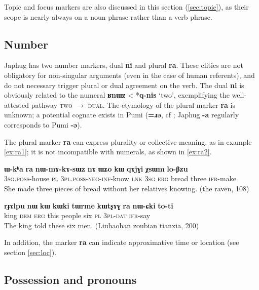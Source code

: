 \documentclass[oldfontcommands,oneside,a4paper,11pt]{article}
\newcommand{\ipa}[1]{\mbox{\phon\textbf{#1}}} %
\begin{document}
Topic and focus markers are also discussed in this section (\ref{sec:topic}), as their scope is nearly always on a noun phrase rather than a verb phrase.

\subsection{Number} \label{sec:number}

Japhug has two number markers, dual \ipa{ni} and plural \ipa{ra}. These clitics are not obligatory for non-singular arguments (even in the case of human referents), and do not necessary trigger plural or dual agreement on the verb. The dual \ipa{ni} is obviously related to the numeral \ipa{ʁnɯz} < *\ipa{q-nis} `two', exemplifying the well-attested pathway \textsc{two} $\rightarrow$ \textsc{dual}. The etymology of the plural marker \ipa{ra} is unknown; a potential cognate exists in Pumi (\ipa{=ɹə}, cf \citealt[135]{daudey14grammar}; Japhug \ipa{-a} regularly corresponds to Pumi \ipa{-ə}).
 
  The plural marker \ipa{ra} can express plurality or collective meaning, as in example \ref{ex:ra1}; it is not incompatible with numerals, as shown in \ref{ex:ra2}.
 
\begin{exe}
\ex \label{ex:ra1}
\gll \ipa{ɯ-kʰa} 	\ipa{ra} 	\ipa{nɯ-mɤ-kɤ-sɯz} 	\ipa{nɤ} 	\ipa{ɯʑo} 	\ipa{kɯ} 	\ipa{qɤjɣi} 	\ipa{χsɯm} 	\ipa{lo-βzu} \\
\textsc{3sg.poss}-house \textsc{pl} \textsc{3pl.poss-neg-inf}-know \textsc{lnk} \textsc{3sg} \textsc{erg} bread three \textsc{ifr}-make \\
\glt She made three pieces of bread without her relatives knowing. (the raven, 108)
\end{exe}

\begin{exe}
\ex \label{ex:ra2}
\gll 
 \ipa{rɟɤlpu} 	\ipa{nɯ} 	\ipa{kɯ} 	\ipa{kɯki} 	\ipa{tɯrme} 	\ipa{kɯtʂɤɣ} 	\ipa{ra} 	\ipa{nɯ-ɕki}  	\ipa{to-ti} \\
 king \textsc{dem} \textsc{erg} this people six \textsc{pl} \textsc{3pl-dat} \textsc{ifr}-say  \\
 \glt The king told these six men. (Liuhaohan zoubian tianxia, 200)
\end{exe}

In addition, the marker \ipa{ra} can indicate approximative time or location  (see section  \ref{sec:loc}).
 


 \subsection{Possession and pronouns} \label{sec:pronouns}
 
\end{document}
